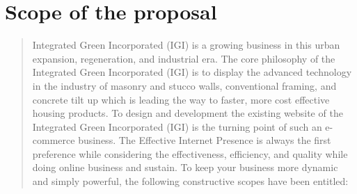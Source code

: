 \documentclass[35pt]{report}
\begin{document}
\clearpage

\normalsize
{}

	\chapter{Scope of the proposal}
		\begin{quote}
		Integrated Green Incorporated (IGI) is a growing business in this urban expansion, regeneration, and industrial era. The core philosophy of the Integrated Green Incorporated (IGI) is to display the advanced technology in the industry of masonry and stucco walls, conventional framing, and concrete tilt up which is leading the way to faster, more cost effective housing products. 
To design and development the existing website of the Integrated Green Incorporated (IGI) is the turning point of such an e-commerce business. The Effective Internet Presence is always the first preference while considering the effectiveness, efficiency, and quality while doing online business and sustain. To keep your business more dynamic and simply powerful, the following constructive scopes have been entitled: 


\end{quote}
\end{document}
